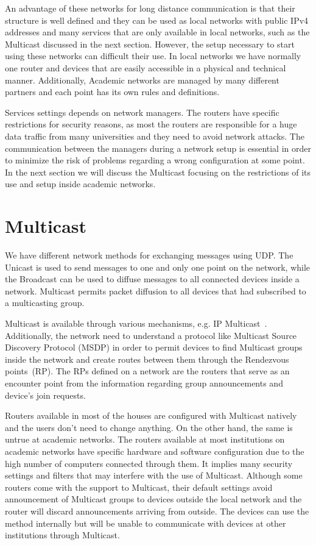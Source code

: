 An advantage of these networks for long distance communication is that their structure is well defined and they can be used as local networks with public IPv4 addresses and many services that are only available in local networks, such as the Multicast discussed in the next section.
However, the setup necessary to start using these networks can difficult their use.
In local networks we have normally one router and devices that are easily accessible in a physical and technical manner.
Additionally, Academic networks are managed by many different partners and each point has its own rules and definitions.

Services settings depends on network managers.
The routers have specific restrictions for security reasons, as most the routers are responsible for a huge data traffic from many universities and they need to avoid network attacks.
The communication between the managers during a network setup is essential in order to minimize the risk of problems regarding a wrong configuration at some point.
In the next section we will discuss the Multicast focusing on the restrictions of its use and setup inside academic networks.

\section{Multicast}
\label{sec:multicast}

We have different network methods for exchanging messages using UDP.
The Unicast is used to send messages to one and only one point on the network, while the Broadcast can be used to diffuse messages to all connected devices inside a network.  
Multicast permits packet diffusion to all devices that had subscribed to a multicasting group.

Multicast is available through various mechanisms, e.g. IP Multicast~\citep{Diot2000ipmulticast}.
Additionally, the network need to understand a protocol like Multicast Source Discovery Protocol (MSDP) in order to permit devices to find Multicast groups inside the network and create routes between them through the Rendezvous points~(RP).
The RPs defined on a network are the routers that serve as an encounter point from the information regarding group announcements and device's join requests.

Routers available in most of the houses are configured with Multicast natively and the users don't need to change anything.
On the other hand, the same is untrue at academic networks.
The routers available at most institutions on academic networks have specific hardware and software configuration due to the high number of computers connected through them.
It implies many security settings and filters that may interfere with the use of Multicast.
Although some routers come with the support to Multicast, their default settings avoid announcement of Multicast groups to devices outside the local network and the router will discard announcements arriving from outside.
The devices can use the method internally but will be unable to communicate with devices at other institutions through Multicast.

